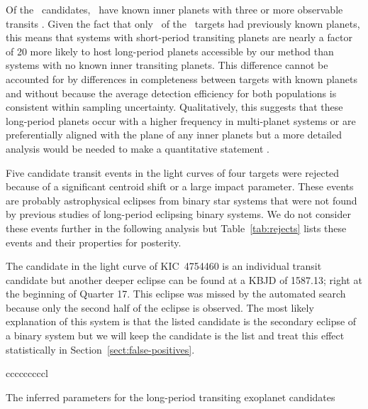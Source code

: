 \documentclass[manuscript, letterpaper]{aastex6}
\newcommand{\sectionname}{Section}
\newcommand{\sectref}[1]{\ref{sect:#1}}
\newcommand{\Sect}[1]{\sectionname~\sectref{#1}}
\newcommand{\sect}[1]{\Sect{#1}}
\begin{document}
Of the \numcands\ candidates, \numinner\ have known inner planets with three
or more observable transits \citep{Coughlin:2016}.
Given the fact that only \numkois\ of the \numtargets\ targets had previously
known planets, this means that systems with short-period transiting planets
are nearly a factor of 20 more likely to host long-period planets accessible
by our method than systems with no known inner transiting planets.
This difference cannot be accounted for by differences in completeness between
targets with known planets and without because the average detection
efficiency for both populations is consistent within sampling uncertainty.
Qualitatively, this suggests that these long-period planets occur with a
higher frequency in multi-planet systems or are preferentially aligned with
the plane of any inner planets but a more detailed analysis would be needed to
make a quantitative statement \citep[see, for example,][]{Tremaine:2012,
Fang:2012, Ballard:2016, Moriarty:2015}.

Five candidate transit events in the light curves of four targets were
rejected because of a significant centroid shift or a large impact parameter.
These events are probably astrophysical eclipses from binary star systems that
were not found by previous studies of long-period eclipsing binary systems.
We do not consider these events further in the following analysis but
Table~\ref{tab:rejects} lists these events and their properties for posterity.

The candidate in the light curve of KIC~4754460 is an individual transit
candidate but another deeper eclipse can be found at a KBJD of 1587.13; right
at the beginning of Quarter 17.
This eclipse was missed by the automated search because only the second half
of the eclipse is observed.
The most likely explanation of this system is that the listed candidate is the
secondary eclipse of a binary system but we will keep the candidate is the
list and treat this effect statistically in \sect{false-positives}.

\begin{floattable}
\begin{deluxetable}{cccccccccl}
\tabletypesize{\footnotesize}
\caption{The inferred parameters for the long-period transiting exoplanet
candidates \label{tab:catalog}}

\end{deluxetable}
\end{floattable}
\end{document}
